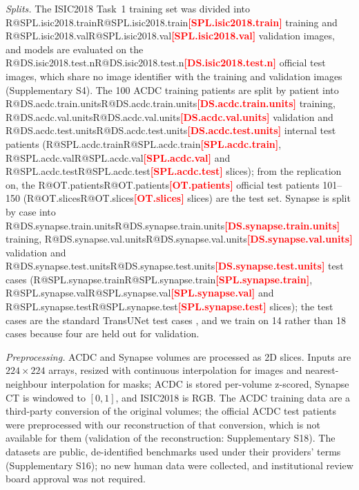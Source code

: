 \documentclass[fleqn,10pt,lineno]{wlpeerj}
\makeatletter
\newcommand{\R}[1]{\ifcsname R@#1\endcsname\csname R@#1\endcsname\else\textbf{\textcolor{red}{[#1]}}\fi}
\makeatother
\begin{document}
\emph{Splits.} The ISIC2018 Task~1 training set was divided into \R{SPL.isic2018.train} training and \R{SPL.isic2018.val} validation images, and models are evaluated on the \R{DS.isic2018.test.n} official test images, which share no image identifier with the training and validation images (Supplementary S4). The 100 ACDC training patients are split by patient into \R{DS.acdc.train.units} training, \R{DS.acdc.val.units} validation and \R{DS.acdc.test.units} internal test patients (\R{SPL.acdc.train}, \R{SPL.acdc.val} and \R{SPL.acdc.test} slices); from the replication on, the \R{OT.patients} official test patients 101--150 (\R{OT.slices} slices) are the test set. Synapse is split by case into \R{DS.synapse.train.units} training, \R{DS.synapse.val.units} validation and \R{DS.synapse.test.units} test cases (\R{SPL.synapse.train}, \R{SPL.synapse.val} and \R{SPL.synapse.test} slices); the test cases are the standard TransUNet test cases \citep{Chen2021TransUNetArxiv}, and we train on 14 rather than 18 cases because four are held out for validation.

\emph{Preprocessing.} ACDC and Synapse volumes are processed as 2D slices. Inputs are $224\times224$ arrays, resized with continuous interpolation for images and nearest-neighbour interpolation for masks; ACDC is stored per-volume z-scored, Synapse CT is windowed to $[0,1]$, and ISIC2018 is RGB. The ACDC training data are a third-party conversion of the original volumes; the official ACDC test patients were preprocessed with our reconstruction of that conversion, which is not available for them (validation of the reconstruction: Supplementary S18). The datasets are public, de-identified benchmarks used under their providers' terms (Supplementary S16); no new human data were collected, and institutional review board approval was not required.
\end{document}

